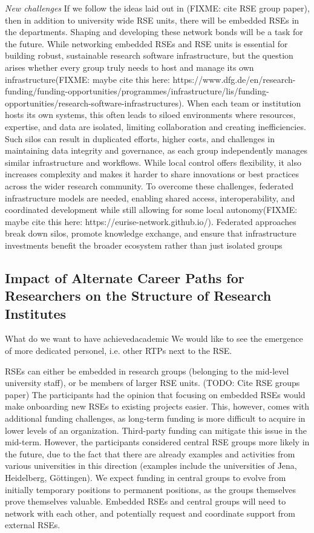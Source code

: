 \documentclass{eceasst}
\begin{document}
\emph{New challenges}
If we follow the ideas laid out in (FIXME: cite RSE group paper), then in addition to university wide RSE units,
there will be embedded RSEs in the departments. Shaping and developing these network bonds will be a task for the future.
While networking embedded RSEs and RSE units is essential for building robust, sustainable research software infrastructure, but the question arises whether every group truly needs to host and manage its own infrastructure(FIXME: maybe cite this here: https://www.dfg.de/en/research-funding/funding-opportunities/programmes/infrastructure/lis/funding-opportunities/research-software-infrastructures).
When each team or institution hosts its own systems, this often leads to siloed environments where resources, expertise, and data are isolated, limiting collaboration and creating inefficiencies. Such silos can result in duplicated efforts, higher costs, and challenges in maintaining data integrity and governance, as each group independently manages similar infrastructure and workflows. While local control offers flexibility, it also increases complexity and makes it harder to share innovations or best practices across the wider research community. To overcome these challenges, federated infrastructure models are needed, enabling shared access, interoperability, and coordinated development while still allowing for some local autonomy(FIXME: maybe cite this here: https://eurise-network.github.io/).
Federated approaches break down silos, promote knowledge exchange, and ensure that infrastructure investments benefit the broader ecosystem rather than just isolated groups

\subsection{Impact of Alternate Career Paths for Researchers on the Structure of Research Institutes}
\begin{whatis}{What do we want to have achieved}{academic}
We would like to see the emergence of more dedicated personel, i.e. other RTPs next to the RSE.
\end{whatis}
RSEs can either be embedded in research groups (belonging to the mid-level university staff),
or be members of larger RSE units. (TODO: Cite RSE groups paper)
The participants had the opinion that focusing on embedded RSEs would make onboarding new RSEs to existing projects easier.
This, however, comes with additional funding challenges,
as long-term funding is more difficult to acquire in lower levels of an organization.
Third-party funding can mitigate this issue in the mid-term.
However, the participants considered central RSE groups more likely in the future,
due to the fact that there are already examples and activities from various universities in this direction
(examples include the universities of Jena, Heidelberg, Göttingen).
We expect funding in central groups to evolve from initially temporary positions to permanent positions,
as the groups themselves prove themselves valuable.
Embedded RSEs and central groups will need to network with each other,
and potentially request and coordinate support from external RSEs.
\end{document}
